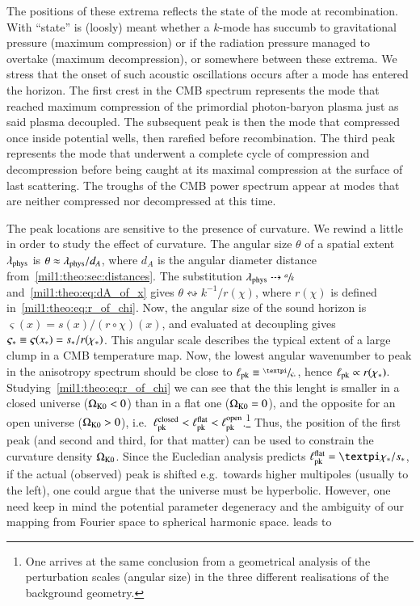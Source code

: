     The positions of these extrema reflects the state of the mode at recombination. With ``state'' is (loosly) meant whether a $k$-mode has succumb to gravitational pressure (maximum compression) or if the radiation pressure managed to overtake (maximum decompression), or somewhere between these extrema. We stress that the onset of such acoustic oscillations occurs after a mode has entered the horizon. The first crest in the CMB spectrum represents the mode that reached maximum compression of the primordial photon-baryon plasma just as said plasma decoupled. The subsequent peak is then the mode that compressed once inside potential wells, then rarefied before recombination. The third peak represents the mode that underwent a complete cycle of compression and decompression before being caught at its maximal compression at the surface of last scattering. The troughs of the CMB power spectrum appear at modes that are neither compressed nor decompressed at this time. 

    The peak locations are sensitive to the presence of curvature. We rewind a little in order to study the effect of curvature. The angular size $\theta$ of a spatial extent $\lambda_\mathrm{phys}$ is $\theta\approx\lambda_\mathrm{phys}/d_A$, where $d_A$ is the angular diameter distance from~\cref{mil1:theo:sec:distances}. The substitution $\lambda_\mathrm{phys}  \dashrightarrow \sfrac{a}{k}$ and~\cref{mil1:theo:eq:dA_of_x} gives $\theta \leftrightsquigarrow  k^{-1}/r(\chi) $, where $r(\chi)$ is defined in~\cref{mil1:theo:eq:r_of_chi}. Now, the angular size of the sound horizon is $\varsigma(x) = s(x)/(r\circ\chi )(x)$, and evaluated at decoupling gives $\varsigma_*\equiv \varsigma(x_*)=s_*/r(\chi_*)$. This angular scale describes the typical extent of a large clump in a CMB temperature map. Now, the lowest angular wavenumber to peak in the anisotropy spectrum should be close to $\ell\ped{pk}\equiv \sfrac{\pi}{\varsigma_*}$, hence $\ell_\mathrm{pk}\propto r(\chi_*) $. Studying~\cref{mil1:theo:eq:r_of_chi} we can see that the this lenght is smaller in a closed universe ($\Omega_{\mathrm{K}0} < 0$) than in a flat one ($\Omega_{\mathrm{K}0} = 0$), and the opposite for an open universe ($\Omega_{\mathrm{K}0} > 0$), i.e.~$\ell_\mathrm{pk}^\mathrm{closed}< \ell_\mathrm{pk}^\mathrm{flat}<\ell_\mathrm{pk}^\mathrm{open}$.\footnote{One arrives at the same conclusion from a geometrical analysis of the perturbation scales (angular size) in the three different realisations of the background geometry.} Thus, the position of the first peak (and second and third, for that matter) can be used to constrain the curvature density $\Omega_{\mathrm{K}0}$. Since the Eucledian analysis predicts $\ell\ped{pk}\ap{flat} = \pi \chi_*/s_*$, if the actual (observed) peak is shifted e.g.~towards higher multipoles (usually to the left), one could argue that the universe must be hyperbolic. However, one need keep in mind the potential parameter degeneracy and the ambiguity of our mapping from Fourier space to spherical harmonic space. %
    leads to
    
